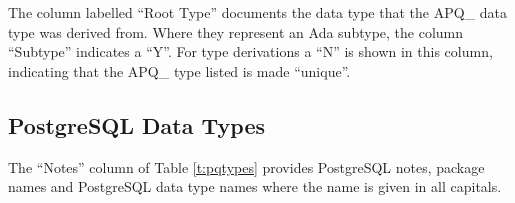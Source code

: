 \documentclass[english,letterpaper]{book}
\begin{document}
The column labelled ``Root Type'' documents the data type that
the APQ\_ data type was derived from. Where they represent an Ada
subtype, the column ``Subtype'' indicates a ``Y''. For type
derivations a ``N'' is shown in this column, indicating that the
APQ\_ type  listed is made ``unique''.\\


\subsection{PostgreSQL Data Types\label{PostgreSQL SQL Data Types}}

The ``Notes'' column of Table \ref{t:pqtypes} provides PostgreSQL notes, package names and
PostgreSQL data type names where the name is given in all capitals.
\end{document}
